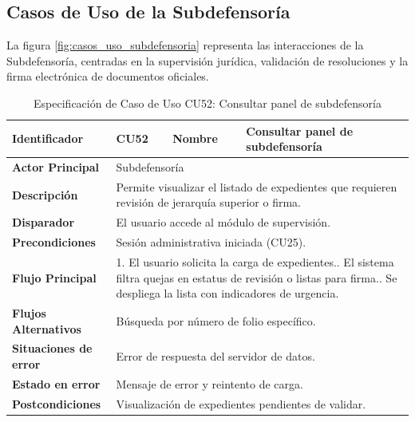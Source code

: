 \subsection{Casos de Uso de la Subdefensoría}
\label{subsec:casos_uso_subdefensoria}

La figura \ref{fig:casos_uso_subdefensoria} representa las interacciones de la Subdefensoría, centradas en la supervisión jurídica, validación de resoluciones y la firma electrónica de documentos oficiales.

\vspace{0.5cm}

\begingroup
\setlength{\parskip}{0pt}
\begin{longtable}{|p{3.5cm}|p{2cm}|p{2.5cm}|p{7cm}|}
\caption{Especificación de Caso de Uso CU52: Consultar panel de subdefensoría}
\label{tab:cu52} \\
\hline
\textbf{Identificador} & CU52 & \textbf{Nombre} & Consultar panel de subdefensoría \\ \hline
\textbf{Actor Principal} & \multicolumn{3}{p{11.5cm}|}{Subdefensoría} \\ \hline
\textbf{Descripción} & \multicolumn{3}{p{11.5cm}|}{Permite visualizar el listado de expedientes que requieren revisión de jerarquía superior o firma.} \\ \hline
\textbf{Disparador} & \multicolumn{3}{p{11.5cm}|}{El usuario accede al módulo de supervisión.} \\ \hline
\textbf{Precondiciones} & \multicolumn{3}{p{11.5cm}|}{Sesión administrativa iniciada (CU25).} \\ \hline
\textbf{Flujo Principal} & \multicolumn{3}{p{11.5cm}|}{1. El usuario solicita la carga de expedientes.\newline 2. El sistema filtra quejas en estatus de revisión o listas para firma.\newline 3. Se despliega la lista con indicadores de urgencia.} \\ \hline
\textbf{Flujos Alternativos} & \multicolumn{3}{p{11.5cm}|}{Búsqueda por número de folio específico.} \\ \hline
\textbf{Situaciones de error} & \multicolumn{3}{p{11.5cm}|}{Error de respuesta del servidor de datos.} \\ \hline
\textbf{Estado en error} & \multicolumn{3}{p{11.5cm}|}{Mensaje de error y reintento de carga.} \\ \hline
\textbf{Postcondiciones} & \multicolumn{3}{p{11.5cm}|}{Visualización de expedientes pendientes de validar.} \\ \hline
\end{longtable}
\endgroup

